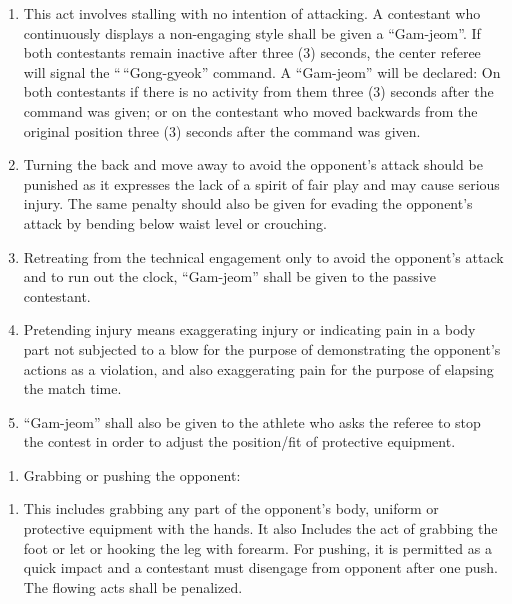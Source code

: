 \documentclass[
]{report}
\providecommand{\tightlist}{%
  \setlength{\itemsep}{0pt}\setlength{\parskip}{0pt}}
\renewcommand{\labelenumi}{\arabic{enumi}}
\begin{document}
\begin{enumerate}
\def\labelenumi{\alph{enumi})}
\item
  This act involves stalling with no intention of attacking. A
  contestant who continuously displays a non-engaging style shall be
  given a ``Gam-jeom''. If both contestants remain inactive after three
  (3) seconds, the center referee will signal the ``\,``Gong-gyeok''
  command. A ``Gam-jeom'' will be declared: On both contestants if there
  is no activity from them three (3) seconds after the command was
  given; or on the contestant who moved backwards from the original
  position three (3) seconds after the command was given.
\item
  Turning the back and move away to avoid the opponent's attack should
  be punished as it expresses the lack of a spirit of fair play and may
  cause serious injury. The same penalty should also be given for
  evading the opponent's attack by bending below waist level or
  crouching.
\item
  Retreating from the technical engagement only to avoid the opponent's
  attack and to run out the clock, ``Gam-jeom'' shall be given to the
  passive contestant.
\item
  Pretending injury means exaggerating injury or indicating pain in a
  body part not subjected to a blow for the purpose of demonstrating the
  opponent's actions as a violation, and also exaggerating pain for the
  purpose of elapsing the match time.
\item
  ``Gam-jeom'' shall also be given to the athlete who asks the referee
  to stop the contest in order to adjust the position/fit of protective
  equipment.
\end{enumerate}

\begin{enumerate}
\def\labelenumi{\roman{enumi}.}
\setcounter{enumi}{3}
\tightlist
\item
  Grabbing or pushing the opponent:
\end{enumerate}

\begin{enumerate}
\def\labelenumi{\alph{enumi})}
\tightlist
\item
  This includes grabbing any part of the opponent's body, uniform or
  protective equipment with the hands. It also Includes the act of
  grabbing the foot or let or hooking the leg with forearm. For pushing,
  it is permitted as a quick impact and a contestant must disengage from
  opponent after one push. The flowing acts shall be penalized.
\end{enumerate}
\end{document}
